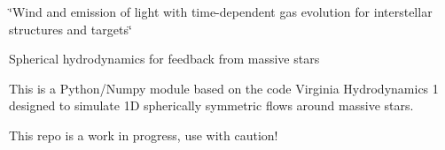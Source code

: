 \char`\"{}\+Wind and emission of light with time-\/dependent gas evolution for interstellar structures and targets\char`\"{}

Spherical hydrodynamics for feedback from massive stars

This is a Python/\+Numpy module based on the code Virginia Hydrodynamics 1 designed to simulate 1D spherically symmetric flows around massive stars.

This repo is a work in progress, use with caution! 